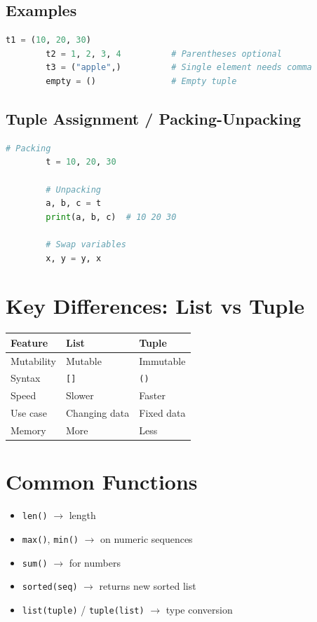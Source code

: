 \documentclass{article}
\begin{document}
	\subsection{Examples}
	\begin{lstlisting}[language=Python]
		t1 = (10, 20, 30)
		t2 = 1, 2, 3, 4          # Parentheses optional
		t3 = ("apple",)          # Single element needs comma
		empty = ()               # Empty tuple
	\end{lstlisting}
	
	\subsection{Tuple Assignment / Packing-Unpacking}
	\begin{lstlisting}[language=Python]
		# Packing
		t = 10, 20, 30
		
		# Unpacking
		a, b, c = t
		print(a, b, c)  # 10 20 30
		
		# Swap variables
		x, y = y, x
	\end{lstlisting}
	
	\section{Key Differences: List vs Tuple}
	
	\begin{tabular}{|l|l|l|}
		\hline
		\textbf{Feature} & \textbf{List} & \textbf{Tuple} \\
		\hline
		Mutability & Mutable & Immutable \\
		Syntax & \texttt{[]} & \texttt{()} \\
		Speed & Slower & Faster \\
		Use case & Changing data & Fixed data \\
		Memory & More & Less \\
		\hline
	\end{tabular}
	
	\section{Common Functions}
	\begin{itemize}
		\item \texttt{len()} $\rightarrow$ length
		\item \texttt{max()}, \texttt{min()} $\rightarrow$ on numeric sequences
		\item \texttt{sum()} $\rightarrow$ for numbers
		\item \texttt{sorted(seq)} $\rightarrow$ returns new sorted list
		\item \texttt{list(tuple)} / \texttt{tuple(list)} $\rightarrow$ type conversion
	\end{itemize}
	
\end{document}
